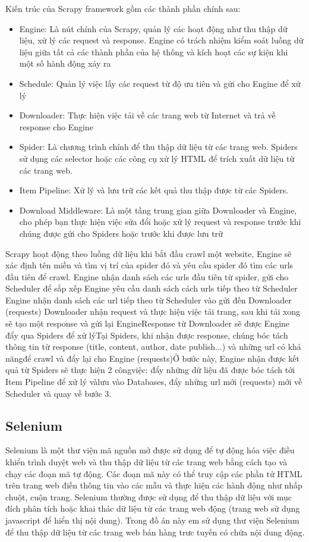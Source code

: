 \documentclass[../DoAn.tex]{subfiles}
\begin{document}
Kiến trúc của Scrapy framework gồm các thành phần chính sau:
\begin{itemize}
    \item Engine: Là nút chính của Scrapy, quản lý các hoạt động như thu thập dữ liệu, xử lý các request và response. Engine có trách nhiệm kiểm soát luồng dữ liệu giữa tất cả các thành phần của hệ thống và kích hoạt các sự kiện khi một số hành động xảy ra
    \item Schedule: Quản lý việc lấy các request từ độ ưu tiên và gửi cho Engine để xử lý
    \item Downloader: Thực hiện việc tải về các trang web từ Internet và trả về response cho Engine
    \item Spider: Là chương trình chính để thu thập dữ liệu từ các trang web. Spiders sử dụng các selector hoặc các công cụ xử lý HTML để trích xuất dữ liệu từ các trang web.
    \item Item Pipeline: Xử lý và lưu trữ các kết quả thu thập được từ các Spiders.
    \item Download Middleware: Là một tầng trung gian giữa Downloader và Engine, cho phép bạn thực hiện việc sửa đổi hoặc xử lý request và response trước khi chúng được gửi cho Spiders hoặc trước khi được lưu trữ
\end{itemize}

Scrapy hoạt động theo luồng dữ liệu khi bắt đầu crawl một website, Engine sẽ xác định tên miền và tìm vị trí của spider đó và yêu cầu spider đó tìm các urls đầu tiên để crawl. Engine nhận danh sách các urls đầu tiên từ spider, gửi cho Scheduler để sắp xếp Engine yêu cầu danh sách cách urls tiếp theo từ Scheduler Engine nhận danh sách các url tiếp theo từ Scheduler vào gửi đến Downloader (requests) Downloader nhận request và thực hiện việc tải trang, sau khi tải xong sẽ tạo một response và gửi lại EngineResponse từ Downloader sẽ được Engine đẩy qua Spiders để xử lýTại Spiders, khi nhận được response, chúng bóc tách thông tin từ response (title, content, author, date publish...) và những url có khả năngđể crawl và đẩy lại cho Engine (requests)Ở bước này, Engine nhận được kết quả từ Spiders sẽ thực hiện 2 côngviệc: đẩy những dữ liệu đã được bóc tách tới Item Pipeline để xử lý vàlưu vào Databases, đẩy những url mới (requests) mới về Scheduler và quay về bước 3.

\subsection{Selenium}
\label{subsection:3.1.2}
Selenium là một thư viện mã nguồn mở được sử dụng để tự động hóa việc điều khiển trình duyệt web và thu thập dữ liệu từ các trang web bằng cách tạo và chạy các đoạn mã tự động. Các đoạn mã này có thể truy cập các phần tử HTML trên trang web điền thông tin vào các mẫu và thực hiện các hành động như nhấp chuột, cuộn trang. Selenium thường được sử dụng để thu thập dữ liệu với mục đích phân tích hoặc khai thác dữ liệu từ các trang web động (trang web sử dụng javascript để hiển thị nội dung). Trong đồ án này em sử dụng thư viện Selenium để thu thập dữ liệu từ các trang web bán hàng trưc tuyến có chứa nội dung động.
\end{document}
